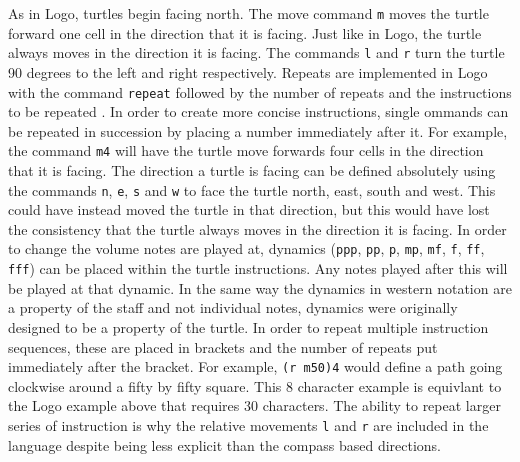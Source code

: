 \documentclass{article}
\begin{document}
As in Logo, turtles begin facing north. The move command \texttt{m} moves the turtle forward one cell in the direction that it is facing. Just like in Logo, the turtle always moves in the direction it is facing. The commands \texttt{l} and \texttt{r} turn the turtle 90 degrees to the left and right respectively. Repeats are implemented in Logo with the command \texttt{repeat} followed by the number of repeats and the instructions to be repeated \cite{goldman:turtle}. In order to create more concise instructions, single ommands can be repeated in succession by placing a number immediately after it. For example, the command \texttt{m4} will have the turtle move forwards four cells in the direction that it is facing. The direction a turtle is facing can be defined absolutely using the commands \texttt{n}, \texttt{e}, \texttt{s} and \texttt{w} to face the turtle north, east, south and west. This could have instead moved the turtle in that direction, but this would have lost the consistency that the turtle always moves in the direction it is facing. In order to change the volume notes are played at, dynamics (\texttt{ppp}, \texttt{pp}, \texttt{p}, \texttt{mp}, \texttt{mf}, \texttt{f}, \texttt{ff}, \texttt{fff}) can be placed within the turtle instructions. Any notes played after this will be played at that dynamic. In the same way the dynamics in western notation are a property of the staff and not individual notes, dynamics were originally designed to be a property of the turtle. In order to repeat multiple instruction sequences, these are placed in brackets and the number of repeats put immediately after the bracket. For example, \texttt{(r m50)4} would define a path going clockwise around a fifty by fifty square. This 8 character example is equivlant to the Logo example above that requires 30 characters. The ability to repeat larger series of instruction is why the relative movements \texttt{l} and \texttt{r} are included in the language despite being less explicit than the compass based directions.
\end{document}
